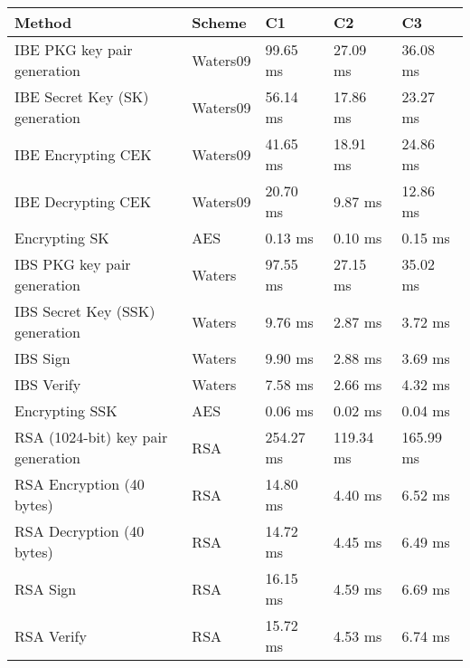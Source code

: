 \begin{table}[h]
  \begin{tabular}[c]{lllll}
  Method                                      & Scheme          & C1              & C2          & C3              \\ \hline
  IBE PKG key pair generation                 & Waters09        & 99.65 ms        & 27.09 ms    & 36.08 ms     \\ %
  IBE Secret Key (SK) generation              & Waters09        & 56.14 ms        & 17.86 ms    & 23.27 ms     \\ %
  IBE Encrypting CEK                          & Waters09        & 41.65 ms        & 18.91 ms    & 24.86 ms     \\ %
  IBE Decrypting CEK                          & Waters09        & 20.70 ms        & 9.87 ms     & 12.86 ms      \\ %
  Encrypting SK                               & AES             & 0.13 ms         & 0.10 ms     & 0.15 ms     \\ %
  IBS PKG key pair generation                 & Waters          & 97.55 ms        & 27.15 ms    & 35.02 ms     \\ %
  IBS Secret Key (SSK) generation             & Waters          & 9.76 ms         & 2.87 ms     & 3.72 ms     \\ %
  IBS Sign                                    & Waters          & 9.90 ms         & 2.88 ms     & 3.69 ms     \\ %
  IBS Verify                                  & Waters          & 7.58 ms         & 2.66 ms     & 4.32 ms     \\ %
  Encrypting SSK                              & AES             & 0.06 ms         & 0.02 ms     & 0.04 ms     \\ %
  RSA (1024-bit) key pair generation          & RSA             & 254.27 ms       & 119.34 ms   & 165.99 ms     \\ %
  RSA Encryption (40 bytes)                   & RSA             & 14.80 ms        & 4.40 ms     & 6.52 ms     \\ %
  RSA Decryption (40 bytes)                   & RSA             & 14.72 ms        & 4.45 ms     & 6.49 ms     \\ %
  RSA Sign                                    & RSA             & 16.15 ms        & 4.59 ms     & 6.69 ms     \\ %
  RSA Verify                                  & RSA             & 15.72 ms        & 4.53 ms     & 6.74 ms     \\ %

\end{tabular}
\end{table}
